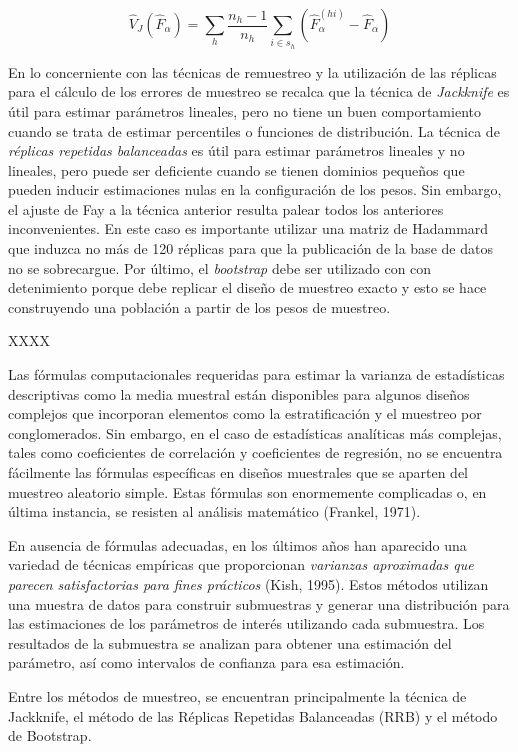 \documentclass[12pt,spanish,]{book}
\begin{document}
\[
\hat{V}_{J}(\hat{F}_{\alpha})=\sum_{h}\frac{n_h-1}{n_h}
\sum_{i\in s_h} \left(\hat{F}_{\alpha}^{(hi)} - \hat{F}_{\alpha}\right)
\]

En lo concerniente con las técnicas de remuestreo y la utilización de las réplicas para el cálculo de los errores de muestreo se recalca que la técnica de \emph{Jackknife} es útil para estimar parámetros lineales, pero no tiene un buen comportamiento cuando se trata de estimar percentiles o funciones de distribución. La técnica de \emph{réplicas repetidas balanceadas} es útil para estimar parámetros lineales y no lineales, pero puede ser deficiente cuando se tienen dominios pequeños que pueden inducir estimaciones nulas en la configuración de los pesos. Sin embargo, el ajuste de Fay a la técnica anterior resulta palear todos los anteriores inconvenientes. En este caso es importante utilizar una matriz de Hadammard que induzca no más de 120 réplicas para que la publicación de la base de datos no se sobrecargue. Por último, el \emph{bootstrap} debe ser utilizado con con detenimiento porque debe replicar el diseño de muestreo exacto y esto se hace construyendo una población a partir de los pesos de muestreo.

XXXX

Las fórmulas computacionales requeridas para estimar la varianza de estadísticas descriptivas como la media muestral están disponibles para algunos diseños complejos que incorporan elementos como la estratificación y el muestreo por conglomerados. Sin embargo, en el caso de estadísticas analíticas más complejas, tales como coeficientes de correlación y coeficientes de regresión, no se encuentra fácilmente las fórmulas específicas en diseños muestrales que se aparten del muestreo aleatorio simple. Estas fórmulas son enormemente complicadas o, en última instancia, se resisten al análisis matemático (Frankel, 1971).

En ausencia de fórmulas adecuadas, en los últimos años han aparecido una variedad de técnicas empíricas que proporcionan \emph{varianzas aproximadas que parecen satisfactorias para fines prácticos} (Kish, 1995). Estos métodos utilizan una muestra de datos para construir submuestras y generar una distribución para las estimaciones de los parámetros de interés utilizando cada submuestra. Los resultados de la submuestra se analizan para obtener una estimación del parámetro, así como intervalos de confianza para esa estimación.

Entre los métodos de muestreo, se encuentran principalmente la técnica de Jackknife, el método de las Réplicas Repetidas Balanceadas (RRB) y el método de Bootstrap.
\end{document}
